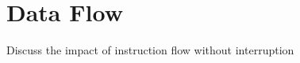 \section{Data Flow}
\label{sec:data_flow}

Discuss the impact of instruction flow without interruption


